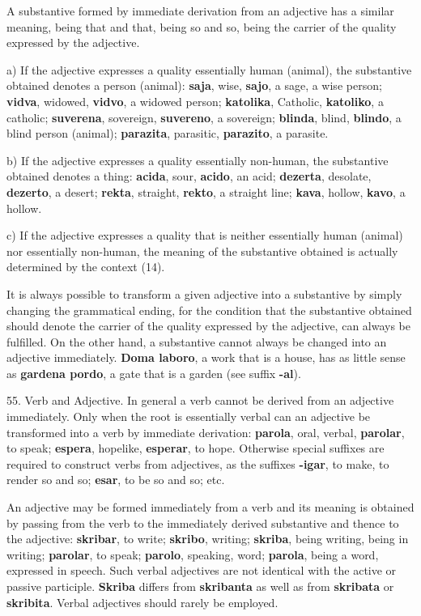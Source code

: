 A substantive formed by immediate derivation from an adjective has a similar meaning, being that and that, being so and so, being the carrier of the quality expressed by the adjective. 

a) If the adjective expresses a quality essentially human (animal), the substantive obtained denotes a person (animal): \textbf{saja}, wise, \textbf{sajo}, a sage, a wise person; \textbf{vidva}, widowed, \textbf{vidvo}, a widowed person; \textbf{katolika}, Catholic, \textbf{katoliko}, a catholic; \textbf{suverena}, sovereign, \textbf{suvereno}, a sovereign; \textbf{blinda}, blind, \textbf{blindo}, a blind person (animal); \textbf{parazita}, parasitic, \textbf{parazito}, a parasite. 

b) If the adjective expresses a quality essentially non-human, the substantive obtained denotes a thing: \textbf{acida}, sour, \textbf{acido}, an acid; \textbf{dezerta}, desolate, \textbf{dezerto}, a desert; \textbf{rekta}, straight, \textbf{rekto}, a straight line; \textbf{kava}, hollow, \textbf{kavo}, a hollow. 

c) If the adjective expresses a quality that is neither essentially human (animal) nor essentially non-human, the meaning of the substantive obtained is actually determined by the context (14). 

It is always possible to transform a given adjective into a substantive by simply changing the grammatical ending, for the condition that the substantive obtained should denote the carrier of the quality expressed by the adjective, can always be fulfilled. On the other hand, a substantive cannot always be changed into an adjective immediately. \textbf{Doma laboro}, a work that is a house, has as little sense as \textbf{gardena pordo}, a gate that is a garden (see suffix \textbf{-al}). 

55. Verb and Adjective. In general a verb cannot be derived from an adjective immediately. Only when the root is essentially verbal can an adjective be transformed into a verb by immediate derivation: \textbf{parola}, oral, verbal, \textbf{parolar}, to speak; \textbf{espera}, hopelike, \textbf{esperar}, to hope. Otherwise special suffixes are required to construct verbs from adjectives, as the suffixes \textbf{-igar}, to make, to render so and so; \textbf{esar}, to be so and so; etc. 

An adjective may be formed immediately from a verb and its meaning is obtained by passing from the verb to the immediately derived substantive and thence to the adjective: \textbf{skribar}, to write; \textbf{skribo}, writing; \textbf{skriba}, being writing, being in writing; \textbf{parolar}, to speak; \textbf{parolo}, speaking, word; \textbf{parola}, being a word, expressed in speech. Such verbal adjectives are not identical with the active or passive participle. \textbf{Skriba} differs from \textbf{skribanta} as well as from \textbf{skribata} or \textbf{skribita}. Verbal adjectives should rarely be employed. 

